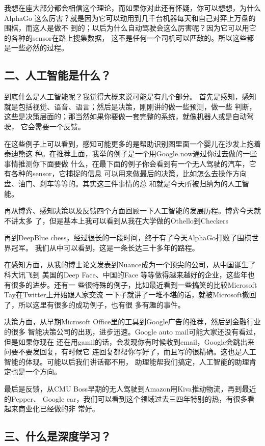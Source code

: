 \documentclass[11pt]{ctexart}
\begin{document}
{{{{我想在座大部分都会相信这个理论，而如果你对此还有怀疑，你可以想想，为什么AlphaGo
这么厉害？就是因为它可以动用到几千台机器每天和自己对弈上万盘的围棋，而这人是做不
到的；以后为什么自动驾驶会这么厉害呢？因为它可以用它的各种的sensor在路上搜集数据，
这不是任何一个司机可以匹敌的。所以这些都是一些必然的过程。

\subsection{二、人工智能是什么？}
\label{sec:org0908268}

到底什么是人工智能呢？我觉得大概来说可能是有几个部分。
首先是感知，感知就是包括视觉、语音、语言；然后是决策，刚刚讲的做一些预测，做一些
判断，这些是决策层面的；那当然如果你要做一套完整的系统，就像机器人或是自动驾驶，
它会需要一个反馈。

在这些例子上可以看到，感知可能更多的是帮助识别图里面一个婴儿在沙发上抱着泰迪熊这
种。在推荐上面，我举的例子是一个用Google now通过你过去做的一些事情推测你下面要做
什么，在最下面的例子你会看到有一个无人驾驶的汽车，它有各种的sensor，它捕捉的信息
可以用来做最后的决策，比如怎么去操作方向盘、油门、刹车等等的。其实这三件事情的总
和就是今天所被归纳为的人工智能。

再从博弈、感知决策以及反馈四个方面回顾一下人工智能的发展历程。博弈今天就不讲太多
了，但是基本上我可以看到从我在大学做的Othello到Checkers

再到DeepBlue chess，经过很长的一段时间，终于有了今天AlphaGo打败了围棋世界冠军。
我们从中可以看到，这是一条长达三十多年的路程。

在感知方面，从我的博士论文发表到Nuance成为一个顶尖的公司，从中国诞生了科大讯飞到
美国的Deep Face、中国的Face 等等做得越来越好的企业，这些年也有很多的进步。还有一
些很特殊的例子，比如最近看到一些搞笑的比较Microsoft Tay在Twitter上开始跟人家交流
一下子就讲了一堆不堪的话，就被Microsoft撤回了，所以这里有很多的成功例子，也有很
多有趣的事件。

决策方面，从早期Microsoft Office里的工具到Google广告的推荐，然后到金融行业的很多
智能决策公司的出现，进步迅速。Google auto mail可能大家还没有看过，但是如果你现在
还在用gamil的话，会发现你有时候收到email，Google会跳出来问要不要发回复，有时候它
连回复都帮你写好了，而且写的很精确。这也是人工智能的体现。可能以后我们讲话都不用，
助理能帮我们搞定，人工智能的助理肯定也是一个方向。

最后是反馈，从CMU Boss早期的无人驾驶到Amazon用Kiva推动物流，再到最近的Pepper、
Google car，我们可以看到这个领域过去三四年特别的热，有很多看起来商业化已经做的非
常好。
\subsection{三、什么是深度学习？}
\label{sec:orgb1f1b25}

}}}}
\end{document}
